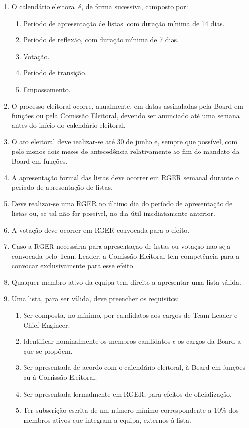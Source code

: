 \begin{enumerate}
  \item O calendário eleitoral é, de forma sucessiva, composto por:
  \begin{enumerate}
    \item Período de apresentação de listas, com duração mínima de 14 dias.
    \item Período de reflexão, com duração mínima de 7 dias.
    \item Votação.
    \item Período de transição.
    \item Empossamento.
  \end{enumerate}
  \item O processo eleitoral ocorre, anualmente, em datas assinaladas pela Board em funções ou pela Comissão Eleitoral, devendo ser anunciado até uma semana antes do início do calendário eleitoral.
  \item O ato eleitoral deve realizar-se até 30 de junho e, sempre que possível, com pelo menos dois meses de antecedência relativamente ao fim do mandato da Board em funções.
  \item A apresentação formal das listas deve ocorrer em RGER semanal durante o período de apresentação de listas.
  \item Deve realizar-se uma RGER no último dia do período de apresentação de listas ou, se tal não for possível, no dia útil imediatamente anterior.
  \item A votação deve ocorrer em RGER convocada para o efeito.
  \item Caso a RGER necessária para apresentação de listas ou votação não seja convocada pelo Team Leader, a Comissão Eleitoral tem competência para a convocar exclusivamente para esse efeito.
  \item Qualquer membro ativo da equipa tem direito a apresentar uma lista válida.
  \item Uma lista, para ser válida, deve preencher os requisitos:
  \begin{enumerate}
    \item Ser composta, no mínimo, por candidatos aos cargos de Team Leader e Chief Engineer.
    \item Identificar nominalmente os membros candidatos e os cargos da Board a que se propõem.
    \item Ser apresentada de acordo com o calendário eleitoral, à Board em funções ou à Comissão Eleitoral.
    \item Ser apresentada formalmente em RGER, para efeitos de oficialização.
    \item Ter subscrição escrita de um número mínimo correspondente a 10\% dos membros ativos que integram a equipa, externos à lista.

\end{enumerate}
\end{enumerate}

